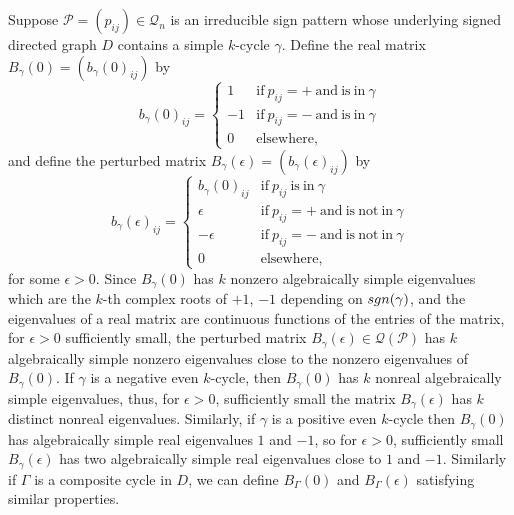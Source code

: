 \documentclass[10pt,a4paper]{amsart}
\numberwithin{equation}{section}
\def\sgn{{\rm sgn}}
\begin{document}
	Suppose $\mathcal{P}=(p_{ij})\in \mathcal{Q}_n$ is an irreducible sign pattern whose underlying signed directed graph $D$ contains a simple $k$-cycle $\gamma$.  Define the real matrix $B_\gamma(0)=(b_\gamma(0)_{ij})$ by
	\begin{equation} \label{e1}
		b_{\gamma}(0)_{ij}= \begin{cases}
			1 & \text{if}\ p_{ij}=+ ~\text{and}~ \text{is}~ \text{in}~ \gamma \\
			-1 & \text{if}\ p_{ij}=- ~\text{and}~ \text{is}~ \text{in}~ \gamma \\
			0 & \text{elsewhere,}
		\end{cases}
	\end{equation}
	and define the perturbed matrix $B_\gamma(\epsilon)=(b_\gamma(\epsilon)_{ij})$ by
	\begin{equation} \label{e2}
		b_{\gamma}(\epsilon)_{ij}= \begin{cases}
			b_\gamma(0)_{ij} & \text{if}\ p_{ij}~ \text{is}~ \text{in}~ \gamma \\
			\epsilon & \text{if}\ p_{ij}=+ ~\text{and}~ \text{is}~\text{not}~ \text{in}~ \gamma \\
			-\epsilon & \text{if}\ p_{ij}=- ~\text{and}~ \text{is}~ \text{not}~\text{in}~ \gamma \\
			0 & \text{elsewhere,}
		\end{cases}
	\end{equation}
	for some $\epsilon>0$. Since $B_\gamma(0)$ has $k$ nonzero algebraically simple eigenvalues which are the $k$-th complex roots of $+1$, $-1$ depending on $\sgn(\gamma)$, and the eigenvalues of a real matrix are continuous functions of the entries of the matrix, for $\epsilon>0$ sufficiently small, the perturbed matrix $B_\gamma(\epsilon)\in \mathcal{Q}(\mathcal{P})$ has $k$ algebraically simple nonzero eigenvalues close to the nonzero eigenvalues of $B_\gamma(0)$. If $\gamma$ is a negative even $k$-cycle, then $B_\gamma(0)$ has $k$ nonreal algebraically simple eigenvalues, thus, for $\epsilon>0$, sufficiently small the matrix $B_\gamma(\epsilon)$ has $k$ distinct nonreal eigenvalues. Similarly, if $\gamma$ is a positive even $k$-cycle then $B_\gamma(0)$ has algebraically simple real eigenvalues $1$ and $-1$, so for $\epsilon>0$, sufficiently small $B_\gamma(\epsilon)$ has two algebraically simple real eigenvalues close to $1$ and $-1$.
	Similarly if $\Gamma$ is a composite cycle in $D$, we can define $B_\Gamma(0)$ and $B_{\Gamma}(\epsilon)$ satisfying similar properties. 
	
\end{document}
